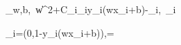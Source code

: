 \min_{w,b,\xi}\ \|w\|^2+C\sum_i\xi_i\quad{}y_i(w\cdot x_i+b)-\xi_i,\ \xi_i

\xi_i=\max(0,1-y_i(w\cdot x_i+b)),\qquad{}=
